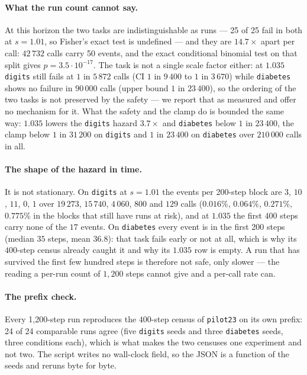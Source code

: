 \paragraph{What the run count cannot say.}  At this horizon the two tasks are
indistinguishable as runs --- 25 of 25 fail in both at $s=1.01$, so Fisher's exact test is
undefined --- and they are $14.7\times$ apart per call: $42\,732$ calls carry 50 events, and
the exact conditional binomial test on that split gives $p=3.5\cdot10^{-17}$.  The task is
not a single scale factor either: at $1.035$ \texttt{digits} still fails at $1$ in
$5\,872$ calls (CI $1$ in $9\,400$ to $1$ in $3\,670$) while \texttt{diabetes} shows no
failure in $90\,000$ calls (upper bound $1$ in $23\,400$), so the ordering of the two tasks
is not preserved by the safety --- we report that as measured and offer no mechanism for
it.  What the safety and the clamp do is bounded the same way: $1.035$ lowers the
\texttt{digits} hazard $3.7\times$ and \texttt{diabetes} below $1$ in $23\,400$, the clamp
below $1$ in $31\,200$ on \texttt{digits} and $1$ in $23\,400$ on \texttt{diabetes} over
$210\,000$ calls in all.

\paragraph{The shape of the hazard in time.}  It is not stationary.  On \texttt{digits} at
$s=1.01$ the events per 200-step block are $3$, $10$, $11$, $0$, $1$ over $19\,273$,
$15\,740$, $4\,060$, $800$ and $129$ calls ($0.016\%$, $0.064\%$, $0.271\%$, $0.775\%$ in
the blocks that still have runs at risk), and at $1.035$ the first $400$ steps carry none
of the $17$ events.  On \texttt{diabetes} every event is in the first 200 steps (median
$35$ steps, mean $36.8$): that task fails early or not at all, which is why its $400$-step
census already caught it and why its $1.035$ row is empty.  A run that has survived the
first few hundred steps is therefore not safe, only slower --- the reading a per-run count
of $1,200$ steps cannot give and a per-call rate can.

\paragraph{The prefix check.}  Every 1,200-step run reproduces the $400$-step census of
\texttt{pilot23} on its own prefix: 24 of 24 comparable runs agree (five \texttt{digits}
seeds and three \texttt{diabetes} seeds, three conditions each), which is what makes the
two censuses one experiment and not two.  The script writes no wall-clock field, so the
JSON is a function of the seeds and reruns byte for byte.

